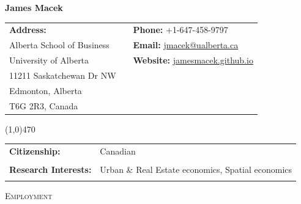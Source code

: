 \documentclass[11pt]{amsart}
\author{}
\begin{document}
\pagestyle{empty}
\setlength\parindent{0pt}

\Huge
\hspace*{\fill} \textbf{James Macek} \hspace*{\fill}
\normalsize
\vspace{1cm}

 \begin{tabular}{p{5cm} p{1cm} p{10cm}}
 \textbf{Address:}       &  & \textbf{Phone:} +1-647-458-9797                                                                                        \\
 Alberta School of Business &  & \textbf{Email:} \href{mailto:jmacek@ualberta.ca}{jmacek@ualberta.ca}                         \\
 University of Alberta  &  & \textbf{Website:} \href{https://jamesmacek.github.io}{jamesmacek.github.io}  \\
11211 Saskatchewan Dr NW       &  &                                                                                                                        \\
Edmonton, Alberta        &  &                                                                                                                        \\
T6G 2R3, Canada          &  &                                                                                                                        
\end{tabular}

\line(1,0){470}


 \begin{tabular}{ p{4cm}  p{15cm}}
 \textbf{Citizenship:}           & Canadian                                     \\
                                 &                                              \\
\textbf{Research Interests:}     & Urban \& Real Estate economics, Spatial economics  \\ 
                                 &                                           \\
\end{tabular}



\vspace{0.2cm}





\LARGE
\textsc{Employment}
\vspace{0.2cm}
\end{document}
